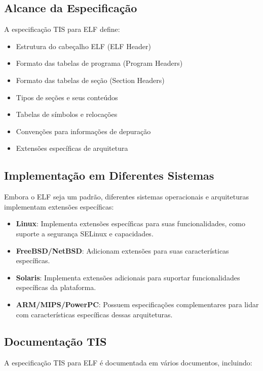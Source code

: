 \subsection{Alcance da Especificação}

A especificação TIS para ELF define:

\begin{itemize}
    \item Estrutura do cabeçalho ELF (ELF Header)
    \item Formato das tabelas de programa (Program Headers)
    \item Formato das tabelas de seção (Section Headers)
    \item Tipos de seções e seus conteúdos
    \item Tabelas de símbolos e relocações
    \item Convenções para informações de depuração
    \item Extensões específicas de arquitetura
\end{itemize}

\subsection{Implementação em Diferentes Sistemas}

Embora o ELF seja um padrão, diferentes sistemas operacionais e arquiteturas implementam extensões específicas:

\begin{itemize}
    \item \textbf{Linux}: Implementa extensões específicas para suas funcionalidades, como suporte a segurança SELinux e capacidades.
    \item \textbf{FreeBSD/NetBSD}: Adicionam extensões para suas características específicas.
    \item \textbf{Solaris}: Implementa extensões adicionais para suportar funcionalidades específicas da plataforma.
    \item \textbf{ARM/MIPS/PowerPC}: Possuem especificações complementares para lidar com características específicas dessas arquiteturas.
\end{itemize}

\subsection{Documentação TIS}

A especificação TIS para ELF é documentada em vários documentos, incluindo:

